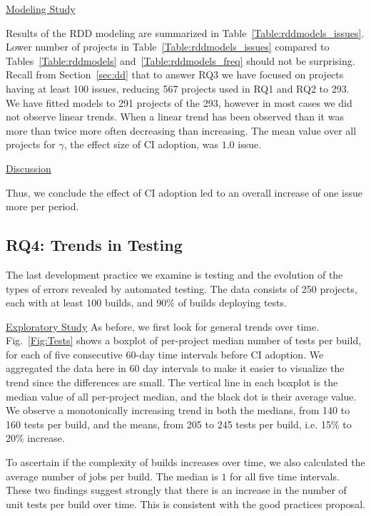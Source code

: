 \noindent \underline{Modeling Study}

Results of the RDD modeling are summarized in Table~\ref{Table:rddmodels_issues}.
Lower number of projects in Table~\ref{Table:rddmodels_issues} compared to Tables~\ref{Table:rddmodels} 
and~\ref{Table:rddmodels_freq} should not be surprising. 
Recall from Section~\ref{sec:dd} that to answer RQ3 we have focused on projects having at least 100 issues,
 reducing 567 projects used in RQ1 and RQ2 to 293.
We have fitted models to 291 projects of the 293, however in most cases we did not observe linear trends.
When a linear trend has been observed than it was more than twice more often decreasing than increasing.
The mean value over all projects for $\gamma$, the effect size of CI adoption, was $1.0$ issue.


\noindent \underline{Discussion}

 Thus, we conclude the effect of CI adoption led to an overall increase of one issue more per period.




\subsection{RQ4: Trends in Testing}

The last development practice we examine is testing and the evolution of the types of errors revealed by automated testing.
The data consists of 250 projects, each with at least 100 builds, and 90\% of builds deploying tests.

\noindent \underline{Exploratory Study} As before, we first look for general trends over time.
Fig.~\ref{Fig:Tests} shows a boxplot of per-project median number of tests per build, for each of five consecutive 60-day time intervals before CI adoption.
We aggregated the data here in 60 day intervals to make it easier to visualize the trend since the differences are small.
The vertical line in each boxplot is the median value of all per-project median, and the black dot is their average value.
We observe a monotonically increasing trend in both the medians, from 140 to 160 tests per build, and the means, from 205 to 245 tests per build, i.e. 15\% to 20\% increase. 

To ascertain if the complexity of builds increases over time, we also calculated the average number of jobs per build.
The median is $1$ for all five time intervals.
These two findings suggest strongly that there is an increase in the number of unit tests per build over time.
This is consistent with the good practices proposal.


